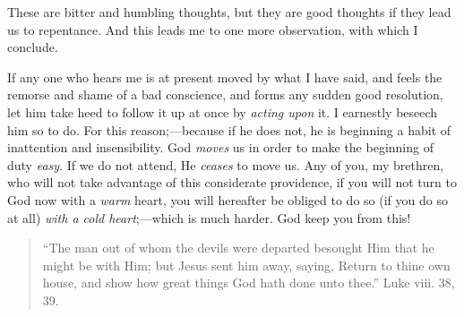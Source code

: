 These are bitter and humbling thoughts, but they are
good thoughts if they lead us to repentance. And this
leads me to one more observation, with which I conclude.

If any one who hears me is at present moved by what I
have said, and feels the remorse and shame of a bad
conscience, and forms any sudden good resolution, let him
take heed to follow it up at once by \emph{acting upon}
it. I earnestly beseech him so to do. For this
reason;—because if he does not, he is beginning a
habit of inattention and insensibility. God \emph{moves}
us in order to make the beginning of duty \emph{easy}. If
we do not attend, He \emph{ceases} to move us. Any of
you, my brethren, who will not take advantage of this
considerate providence, if you will not turn to God now
with a \emph{warm} heart, you will hereafter be obliged to do so
(if you do so at all) \emph{with a cold heart};—which
is much harder. God keep you from this!


\begin{quote}

``The man out of whom the devils were departed
besought Him that he might be with Him; but Jesus
sent him away, saying, Return to thine own house, and
show how great things God hath done unto thee.''
Luke viii. 38, 39.

\end{quote}

